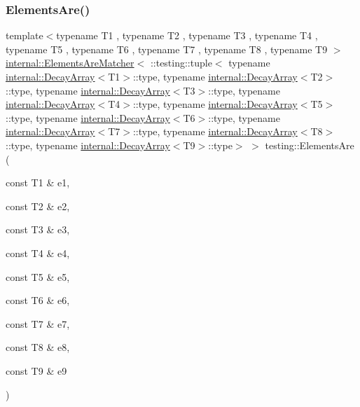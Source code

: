 \subsubsection{\texorpdfstring{Elements\+Are()}{ElementsAre()}\hspace{0.1cm}{\footnotesize\ttfamily [10/11]}}
{\footnotesize\ttfamily template$<$typename T1 , typename T2 , typename T3 , typename T4 , typename T5 , typename T6 , typename T7 , typename T8 , typename T9 $>$ \\
\hyperlink{classtesting_1_1internal_1_1_elements_are_matcher}{internal\+::\+Elements\+Are\+Matcher}$<$ \+::testing\+::tuple$<$ typename \hyperlink{structtesting_1_1internal_1_1_decay_array}{internal\+::\+Decay\+Array}$<$T1$>$\+::type, typename \hyperlink{structtesting_1_1internal_1_1_decay_array}{internal\+::\+Decay\+Array}$<$T2$>$\+::type, typename \hyperlink{structtesting_1_1internal_1_1_decay_array}{internal\+::\+Decay\+Array}$<$T3$>$\+::type, typename \hyperlink{structtesting_1_1internal_1_1_decay_array}{internal\+::\+Decay\+Array}$<$T4$>$\+::type, typename \hyperlink{structtesting_1_1internal_1_1_decay_array}{internal\+::\+Decay\+Array}$<$T5$>$\+::type, typename \hyperlink{structtesting_1_1internal_1_1_decay_array}{internal\+::\+Decay\+Array}$<$T6$>$\+::type, typename \hyperlink{structtesting_1_1internal_1_1_decay_array}{internal\+::\+Decay\+Array}$<$T7$>$\+::type, typename \hyperlink{structtesting_1_1internal_1_1_decay_array}{internal\+::\+Decay\+Array}$<$T8$>$\+::type, typename \hyperlink{structtesting_1_1internal_1_1_decay_array}{internal\+::\+Decay\+Array}$<$T9$>$\+::type$>$ $>$ testing\+::\+Elements\+Are (\begin{DoxyParamCaption}\item[{const T1 \&}]{e1,  }\item[{const T2 \&}]{e2,  }\item[{const T3 \&}]{e3,  }\item[{const T4 \&}]{e4,  }\item[{const T5 \&}]{e5,  }\item[{const T6 \&}]{e6,  }\item[{const T7 \&}]{e7,  }\item[{const T8 \&}]{e8,  }\item[{const T9 \&}]{e9 }\end{DoxyParamCaption})\hspace{0.3cm}{\ttfamily [inline]}}

\mbox{\label{namespacetesting_a047f5f5a28c156a70002668323009ae9}} 

